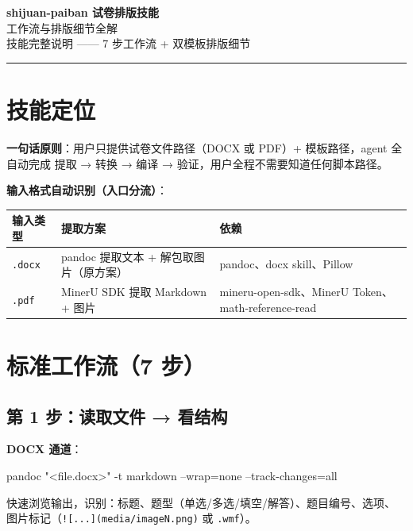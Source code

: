 \documentclass[11pt,a4paper]{ctexart}
\begin{document}
\begin{center}
  {\color{accent}\LARGE\bfseries shijuan-paiban 试卷排版技能}\\[4pt]
  {\color{secondary}\large 工作流与排版细节全解}\\[6pt]
  {\small\color{ink!70} 技能完整说明 —— 7 步工作流 + 双模板排版细节}\\[4pt]
  {\color{accent!40}\rule{0.6\linewidth}{0.8pt}}
\end{center}

\section{技能定位}

\textbf{一句话原则}：用户只提供试卷文件路径（DOCX 或 PDF）+ 模板路径，agent 全自动完成
提取 → 转换 → 编译 → 验证，用户全程不需要知道任何脚本路径。

\textbf{输入格式自动识别（入口分流）}：

\begin{center}
\begin{tabular}{lll}
\toprule
输入类型 & 提取方案 & 依赖 \\
\midrule
\texttt{.docx} & pandoc 提取文本 + 解包取图片（原方案） & pandoc、docx skill、Pillow \\
\texttt{.pdf}  & MinerU SDK 提取 Markdown + 图片 & mineru-open-sdk、MinerU Token、math-reference-read \\
\bottomrule
\end{tabular}
\end{center}

\section{标准工作流（7 步）}

\subsection{第 1 步：读取文件 → 看结构}

\textbf{DOCX 通道}：

\begin{codeblock}
pandoc "<file.docx>" -t markdown --wrap=none --track-changes=all
\end{codeblock}

快速浏览输出，识别：标题、题型（单选/多选/填空/解答）、题目编号、选项、
图片标记（\texttt{![...](media/imageN.png)} 或 \texttt{.wmf}）。
\end{document}
